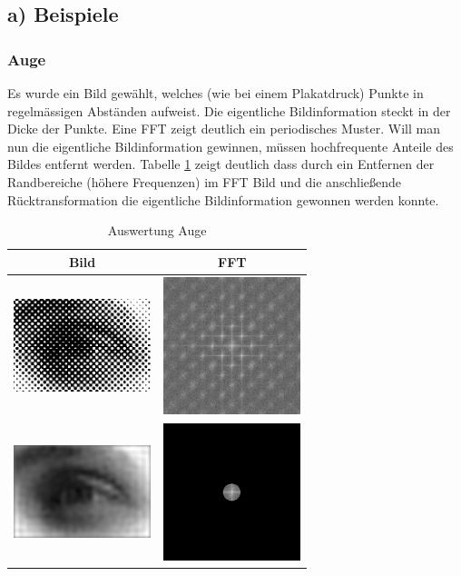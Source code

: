 \documentclass[12pt,german]{article}
\begin{document}
\subsection{a) Beispiele}

\subsubsection{Auge}
Es wurde ein Bild gewählt, welches (wie bei einem Plakatdruck) Punkte in regelmässigen Abständen aufweist. Die eigentliche Bildinformation steckt in der Dicke der Punkte. Eine FFT zeigt deutlich ein periodisches Muster. Will man nun die eigentliche Bildinformation gewinnen, müssen hochfrequente Anteile des Bildes entfernt werden. Tabelle \ref{tab:AuswertungAuge} zeigt deutlich dass durch ein Entfernen der Randbereiche (höhere Frequenzen) im FFT Bild und die anschließende Rücktransformation die eigentliche Bildinformation gewonnen werden konnte.
\begin{table}[H]
  \centering
  \begin{tabular}{c | c}
    \hline
    Bild & FFT \\
    \hline
	\includegraphics[width=4cm]{../testData/Auge.jpg} & \includegraphics[width=4cm]{../testData/Results/Auge/FFT_of_Auge.jpg} \\
    \hline
    \includegraphics[width=4cm]{../testData/Results/Auge/reduced_Auge.jpg} & \includegraphics[width=4cm]{../testData/Results/Auge/reduced_FFT_of_Auge.jpg} \\
  \end{tabular}
  \caption{Auswertung Auge}
  \label{tab:AuswertungAuge}
\end{table}
\end{document}
